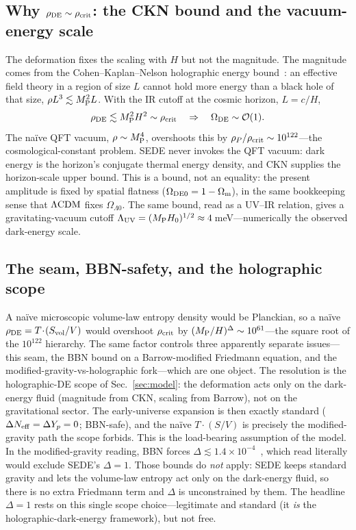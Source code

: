 \subsection{Why $\rho_{\mathrm{DE}}\sim\rho_{\mathrm{crit}}$: the CKN bound and the vacuum-energy scale}
The deformation fixes the scaling with $H$ but not the magnitude. The magnitude comes from the
Cohen--Kaplan--Nelson holographic energy bound~\cite{Cohen:1998zx}: an effective field theory in a
region of size $L$ cannot hold more energy than a black hole of that size, $\rho L^3\lesssim M_{\mathrm P}^2 L$.
With the IR cutoff at the cosmic horizon, $L=c/H$,
\begin{equation}
\rho_{\mathrm{DE}}\lesssim M_{\mathrm P}^2H^2\sim\rho_{\mathrm{crit}}\quad\Rightarrow\quad\Omega_{\rm DE}\sim\mathcal{O}(1).
\label{eq:ckn}
\end{equation}
The naïve QFT vacuum, $\rho\sim M_{\mathrm P}^4$, overshoots this by $\rho_P/\rho_{\mathrm{crit}}\sim10^{122}$---the
cosmological-constant problem. SEDE never invokes the QFT vacuum: dark energy is the horizon's conjugate
thermal energy density, and CKN supplies the horizon-scale upper bound. This is a bound, not an equality:
the present amplitude is fixed by spatial flatness ($\Omega_{\mathrm{DE0}}=1-\Omega_{\mathrm m}$), in the same bookkeeping sense that
$\Lambda\mathrm{CDM}$ fixes $\Omega_{\Lambda0}$. The same bound, read as a UV--IR relation, gives a gravitating-vacuum
cutoff $\Lambda_{\rm UV}=(M_{\mathrm P} H_0)^{1/2}\approx4$\,meV---numerically the observed dark-energy scale.

\subsection{The seam, BBN-safety, and the holographic scope}
A naïve microscopic volume-law entropy density would be Planckian, so a naïve $\rho_{\mathrm{DE}}=T\!\cdot\!(S_{\rm
vol}/V)$ would overshoot $\rho_{\mathrm{crit}}$ by $(M_{\mathrm P}/H)^\Delta\sim10^{61}$---the square root of the $10^{122}$
hierarchy. The same factor controls three apparently separate issues---this seam, the BBN bound on a
Barrow-modified Friedmann equation, and the modified-gravity-vs-holographic fork---which are one object.
The resolution is the holographic-DE scope of Sec.~\ref{sec:model}: the deformation acts only on the
dark-energy fluid (magnitude from CKN, scaling from Barrow), not on the gravitational sector. The
early-universe expansion is then exactly standard ($\Delta N_{\rm eff}=\Delta Y_p=0$; BBN-safe), and the
naïve $T\!\cdot\!(S/V)$ is precisely the modified-gravity path the scope forbids. This is the
load-bearing assumption of the model. In the modified-gravity reading, BBN forces
$\Delta\lesssim1.4\times10^{-4}$~\cite{Barrow:2020tzx}, which read literally would exclude SEDE's
$\Delta=1$. Those bounds do \emph{not} apply: SEDE keeps standard gravity and lets the volume-law
entropy act only on the dark-energy fluid, so there is no extra Friedmann term and $\Delta$ is
unconstrained by them. The headline $\Delta=1$ rests on this single scope choice---legitimate and
standard (it \emph{is} the holographic-dark-energy framework), but not free.

